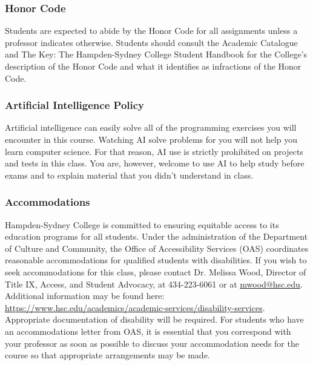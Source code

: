 \documentclass[10pt]{article}
\begin{document}
\subsubsection*{Honor Code}

Students are expected to abide by the Honor Code for all assignments unless a professor indicates otherwise. Students should consult the Academic Catalogue and The Key: The Hampden-Sydney College Student Handbook for the College’s description of the Honor Code and what it identifies as infractions of the Honor Code.

\subsubsection*{Artificial Intelligence Policy}

Artificial intelligence can easily solve all of the programming exercises you will encounter in this course. Watching AI solve problems for you will not help you learn computer science. For that reason, AI use is strictly prohibited on projects and tests in this class.  
You are, however, welcome to use AI to help study before exams and to explain material that you didn't understand in class.  

\subsubsection*{Accommodations}

Hampden-Sydney College is committed to ensuring equitable access to its education programs for all students. Under the administration of the Department of Culture and Community, the Office of Accessibility Services (OAS) coordinates reasonable accommodations for qualified students with disabilities. If you wish to seek accommodations for this class, please contact Dr. Melissa Wood, Director of Title IX, Access, and Student Advocacy, at 434-223-6061 or at \url{mwood@hsc.edu}. Additional information may be found here: \url{https://www.hsc.edu/academics/academic-services/disability-services}. Appropriate documentation of disability will be required. For students who have an accommodations letter from OAS, it is essential that you correspond with your professor as soon as possible to discuss your accommodation needs for the course so that appropriate arrangements may be made. 
\end{document}
